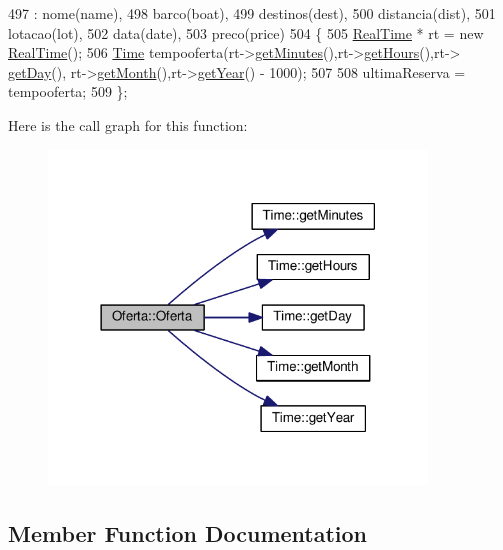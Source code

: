 \begin{DoxyCode}
497                                                                                                            
                          : nome(name),
498 barco(boat),
499 destinos(dest),
500 distancia(dist),
501 lotacao(lot),
502 data(date),
503 preco(price)
504 \{
505     \hyperlink{classRealTime}{RealTime} * rt = \textcolor{keyword}{new} \hyperlink{classRealTime}{RealTime}();
506     \hyperlink{classTime}{Time} tempooferta(rt->\hyperlink{classTime_a800d91da444cd295a329925c45942359}{getMinutes}(),rt->\hyperlink{classTime_ac38ba7bbc9876d7d75c6fb16ba7ac453}{getHours}(),rt->
      \hyperlink{classTime_abdccc37217b520155a67a1d732014f1a}{getDay}(), rt->\hyperlink{classTime_a22fd86b14d3b067cf1447fd9ca5caf6f}{getMonth}(),rt->\hyperlink{classTime_ade4d01d38041bb86a2e1ded9fd3cd28e}{getYear}() - 1000);
507     
508     ultimaReserva = tempooferta;
509 \};
\end{DoxyCode}


Here is the call graph for this function\+:\nopagebreak
\begin{figure}[H]
\begin{center}
\leavevmode
\includegraphics[width=285pt]{classOferta_a49a53f9d6ba51f97a3b428c8fac98d7f_cgraph}
\end{center}
\end{figure}




\subsection{Member Function Documentation}

